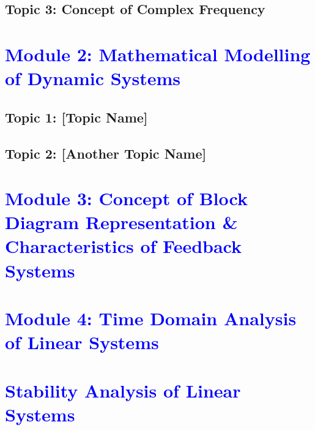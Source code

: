 \documentclass[12pt]{report}
\begin{document}
\section{Topic 3: Concept of Complex Frequency}

\clearpage

\chapter{\textcolor{blue}{Module 2: Mathematical Modelling of Dynamic Systems}}

\section{Topic 1: [Topic Name]}

\section{Topic 2: [Another Topic Name]}

\clearpage

\chapter{\textcolor{blue}{Module 3: Concept of Block Diagram Representation \& Characteristics of Feedback Systems}}

\clearpage

\chapter{\textcolor{blue}{Module 4: Time Domain Analysis of Linear Systems}}

\clearpage

\chapter{\textcolor{blue}{Stability Analysis of Linear Systems}}
\end{document}
